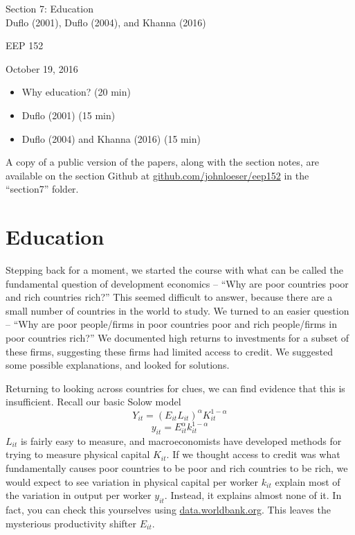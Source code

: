 \documentclass[12pt,english]{article}
\begin{document}
\begin{center}
{\Large{}Section 7: Education} \\
{\large{}Duflo (2001), Duflo (2004), and Khanna (2016)}
\par\end{center}{\Large \par}

\begin{center}
EEP 152
\par\end{center}

\begin{center}
October 19, 2016
\par\end{center}

\begin{itemize}
	\setlength\itemsep{-0.5em}
	\item Why education? (20 min)
	\item Duflo (2001) (15 min)
	\item Duflo (2004) and Khanna (2016) (15 min)
\end{itemize}
A copy of a public version of the papers, along with the section notes, are available on the section Github at \href{github.com/johnloeser/eep152}{github.com/johnloeser/eep152} in the ``section7'' folder.

\section{Education}

Stepping back for a moment, we started the course with what can be called the fundamental question of development economics -- ``Why are poor countries poor and rich countries rich?'' This seemed difficult to answer, because there are a small number of countries in the world to study. We turned to an easier question -- ``Why are poor people/firms in poor countries poor and rich people/firms in poor countries rich?'' We documented high returns to investments for a subset of these firms, suggesting these firms had limited access to credit. We suggested some possible explanations, and looked for solutions.

Returning to looking across countries for clues, we can find evidence that this is insufficient. Recall our basic Solow model
$$ Y_{it} = (E_{it} L_{it})^{\alpha} K_{it}^{1 - \alpha} $$
$$ y_{it} = E_{it}^{\alpha} k_{it}^{1 - \alpha} $$
$L_{it}$ is fairly easy to measure, and macroeconomists have developed methods for trying to measure physical capital $K_{it}$. If we thought access to credit was what fundamentally causes poor countries to be poor and rich countries to be rich, we would expect to see variation in physical capital per worker $k_{it}$ explain most of the variation in output per worker $y_{it}$. Instead, it explains almost none of it. In fact, you can check this yourselves using \href{data.worldbank.org}{data.worldbank.org}. This leaves the mysterious productivity shifter $E_{it}$.
\end{document}
